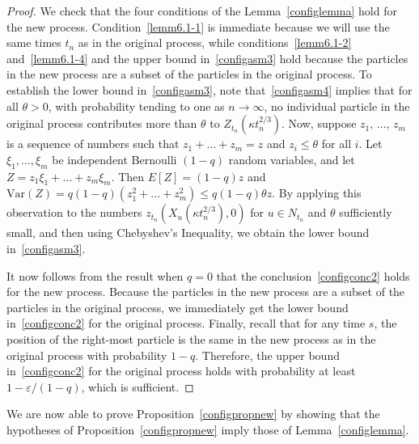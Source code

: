 \documentclass[10pt]{amsart}
\theoremstyle{definition}\newtheorem{defi}[theo]{Definition}\newtheorem{rema}[theo]{Remark}\newtheorem{exam}[theo]{Example}\newtheorem{exem}[theo]{Example}\newtheorem{nota}[theo]{Notation}
\newcommand*\eps{\varepsilon}
\newcommand{\1} {\mathds{1}}
\begin{document}
\begin{proof}
We check that the four conditions of the Lemma~\ref{configlemma} hold for the new process. Condition~\eqref{lemm6.1-1} is immediate because we will use the same times $t_n$ as in the original process, while conditions~\eqref{lemm6.1-2} and~\eqref{lemm6.1-4} and the upper bound in~\eqref{configasm3} hold because the particles in the new process are a subset of the particles in the original process. To establish the lower bound in~\eqref{configasm3}, note that~\eqref{configasm4} implies that for all $\theta > 0$, with probability tending to one as $n \rightarrow \infty$, no individual particle in the original process contributes more than $\theta$ to $Z_{t_n}(\kappa t_n^{2/3})$. Now, suppose $z_1,\,\dots,\,z_m$ is a sequence of numbers such that $z_1 + \dots + z_m = z$ and $z_i \leq \theta$ for all $i$. Let $\xi_1, \dots, \xi_m$ be independent Bernoulli $(1-q)$ random variables, and let $Z = z_1 \xi_1 + \dots + z_m \xi_m$. Then $E[Z] = (1 - q) z$ and $\text{Var}(Z) = q(1-q)(z_1^2 + \dots + z_m^2) \leq q(1 - q) \theta z$. By applying this observation to the numbers $z_{t_n}(X_u(\kappa t_n^{2/3}), 0)$ for $u \in N_{t_n}$ and $\theta$ sufficiently small, and then using Chebyshev's Inequality, we obtain the lower bound in~\eqref{configasm3}.

It now follows from the result when $q = 0$ that the conclusion~\eqref{configconc2} holds for the new process. Because the particles in the new process are a subset of the particles in the original process, we immediately get the lower bound in~\eqref{configconc2} for the original process. Finally, recall that for any time $s$, the position of the right-most particle is the same in the new process as in the original process with probability $1 - q$. Therefore, the upper bound in~\eqref{configconc2} for the original process holds with probability at least $1 - \eps/(1 - q)$, which is sufficient.
\end{proof}

We are now able to prove Proposition~\ref{configpropnew} by showing that the hypotheses of Proposition~\ref{configpropnew} imply those of Lemma~\ref{configlemma}.
\end{document}
